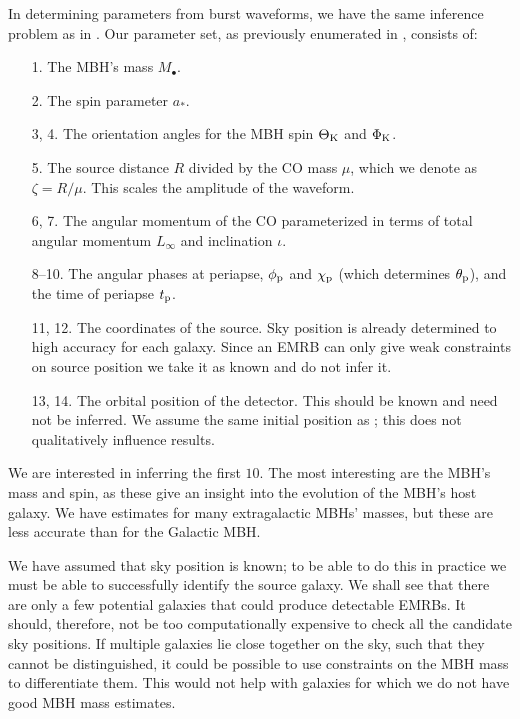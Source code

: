 In determining parameters from burst waveforms, we have the same inference problem as in . Our parameter set, as previously enumerated in , consists of:
\begin{enumerate}[leftmargin=*, widest=\:88--88.]
\item[1.] The MBH's mass $M_\bullet$.
\item[2.] The spin parameter $a_\ast$.
\item[3, 4.] The orientation angles for the MBH spin $\Theta_\mathrm{K}$ and $\Phi_\mathrm{K}$.
\item[5.] The source distance $R$ divided by the CO mass $\mu$, which we denote as $\zeta = R/\mu$. This scales the amplitude of the waveform.
\item[6, 7.] The angular momentum of the CO parameterized in terms of total angular momentum $L_\infty$ and inclination $\iota$.
\item[8--10.] The angular phases at periapse, $\phi_\mathrm{p}$  and $\chi_\mathrm{p}$ (which determines $\theta_\mathrm{p}$), and the time of periapse $t_\mathrm{p}$.
\item[11, 12.] The coordinates of the source. Sky position is already determined to high accuracy for each galaxy. Since an EMRB can only give weak constraints on source position we take it as known and do not infer it.
\item[13, 14.] The orbital position of the detector. This should be known and need not be inferred. We assume the same initial position as \citet{Cutler1998}; this does not qualitatively influence results.
\end{enumerate}
We are interested in inferring the first $10$. The most interesting are the MBH's mass and spin, as these give an insight into the evolution of the MBH's host galaxy. We have estimates for many extragalactic MBHs' masses, but these are less accurate than for the Galactic MBH.

We have assumed that sky position is known; to be able to do this in practice we must be able to successfully identify the source galaxy. We shall see that there are only a few potential galaxies that could produce detectable EMRBs. It should, therefore, not be too computationally expensive to check all the candidate sky positions. If multiple galaxies lie close together on the sky, such that they cannot be distinguished, it could be possible to use constraints on the MBH mass to differentiate them. This would not help with galaxies for which we do not have good MBH mass estimates.

